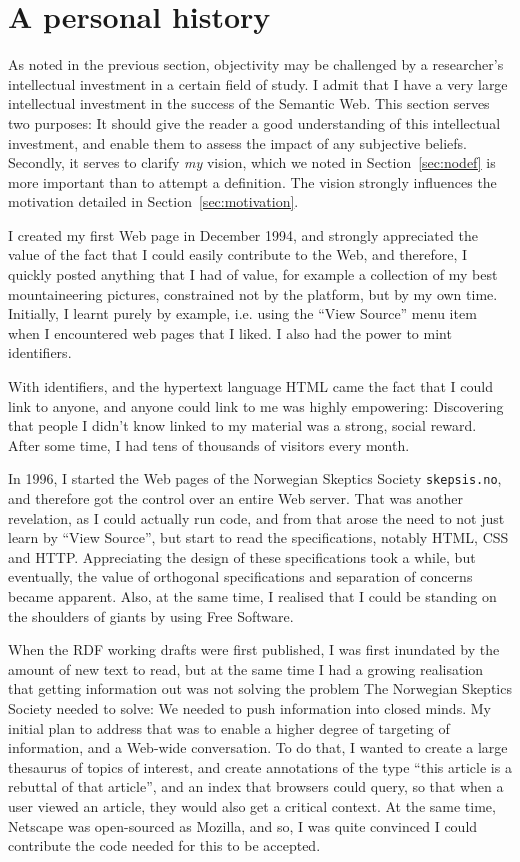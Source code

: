 \section{A personal history}\label{sec:history}

As noted in the previous section, objectivity may be challenged by a
researcher's intellectual investment in a certain field of study. I
admit that I have a very large intellectual investment in the success
of the Semantic Web. This section serves two purposes: It should give
the reader a good understanding of this intellectual investment, and
enable them to assess the impact of any subjective beliefs. Secondly,
it serves to clarify \emph{my} vision, which we noted in
Section~\ref{sec:nodef} is more important than to attempt a
definition. The vision strongly influences the motivation detailed in
Section~\ref{sec:motivation}.


I created my first Web page in December 1994, and strongly appreciated
the value of the fact that I could easily contribute to the Web, and
therefore, I quickly posted anything that I had of value, for example
a collection of my best mountaineering pictures, constrained not by
the platform, but by my own time. Initially, I learnt purely by
example, i.e. using the ``View Source'' menu item when I encountered
web pages that I liked. I also had the power to mint identifiers. 

With identifiers, and the hypertext language HTML came the fact that I
could link to anyone, and anyone could link to me was highly
empowering: Discovering that people I didn't know linked to my
material was a strong, social reward. After some time, I had tens of
thousands of visitors every month.

In 1996, I started the Web pages of the Norwegian Skeptics Society
\texttt{skepsis.no}, and therefore got the control over an entire Web
server. That was another revelation, as I could actually run code, and
from that arose the need to not just learn by ``View Source'', but
start to read the specifications, notably HTML, CSS and
HTTP. Appreciating the design of these specifications took a while,
but eventually, the value of orthogonal specifications and separation
of concerns became apparent. Also, at the same time, I realised that I
could be standing on the shoulders of giants by using Free Software.

When the RDF working drafts were first published, I was first
inundated by the amount of new text to read, but at the same time I
had a growing realisation that getting information out was not solving
the problem The Norwegian Skeptics Society needed to solve: We needed
to push information into closed minds. My initial plan to address that
was to enable a higher degree of targeting of information, and a Web-wide
conversation. To do that, I wanted to create a large thesaurus of
topics of interest, and create annotations of the type ``this article
is a rebuttal of that article'', and an index that browsers could
query, so that when a user viewed an article, they would also get a
critical context. At the same time, Netscape was open-sourced as
Mozilla, and so, I was quite convinced I could contribute the code
needed for this to be accepted. 

